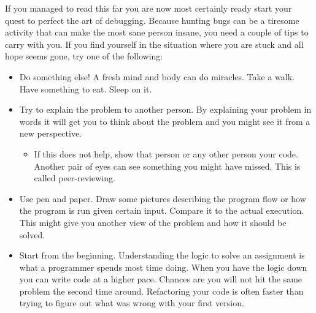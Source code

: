 \documentclass[11pt,a4paper,twoside]{article}
\begin{document}
If you managed to read this far you are now most certainly ready start your
quest to perfect the art of debugging. Because hunting bugs can be a tiresome
activity that can make the most sane person insane, you need a couple of tips
to carry with you. If you find yourself in the situation where you are stuck
and all hope seems gone, try one of the following: 

\begin{itemize} 
    \item Do something else! A fresh mind and body can do miracles. Take a walk.
          Have something to eat. Sleep on it. 
    \item Try to explain the problem to another person. By explaining your 
          problem in words it will get you to think about the problem and you 
          might see it from a new perspective.  
    \begin{itemize}
        \item If this does not help, show that person or any other person
              your code. Another pair of eyes can see something you might have 
              missed. This is called peer-reviewing.
    \end{itemize}
    \item Use pen and paper. Draw some pictures describing the program flow or 
          how the program is run given certain input. Compare it to the actual
          execution. This might give you another view of the problem and how it 
          should be solved.
    \item Start from the beginning. Understanding the logic to solve an 
          assignment is what a programmer spends most time doing. When you have
          the logic down you can write code at a higher pace. Chances are you
          will not hit the same problem the second time around. Refactoring your
          code is often faster than trying to figure out what was wrong with 
          your first version.
\end{itemize}
\end{document}
